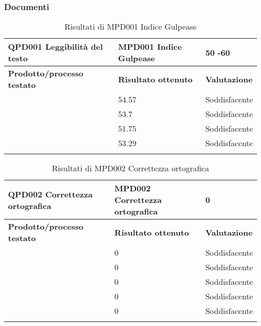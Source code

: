     \subsubsection{Documenti}
    
    \begin{table}[H]
    	{\def\arraystretch{1.5}
   		\begin{tabularx}{\textwidth}{YYY}
   			\textbf{QPD001 Leggibilità del testo} & \textbf{MPD001 Indice Gulpease} & \textbf{50 -60} \\
   			\hline
   			\textbf{Prodotto/processo testato} & \textbf{Risultato ottenuto} & \textbf{Valutazione} \\
   			\hline
   			\NdPd & 54.57 & Soddisfacente \\
   			\SdFd & 53.7 & Soddisfacente \\
   			\PdPd & 51.75 & Soddisfacente \\
   			\PdQd & 53.29 & Soddisfacente \\
   			\hline {}
   			 \\
   		\end{tabularx}}
   	\caption{Risultati di MPD001 Indice Gulpease}
    \end{table}

	\mydoublerule{\linewidth}{0pt}{2pt}

	\begin{table}[H]
		{\def\arraystretch{1.5}
		\begin{tabularx}{\textwidth}{YYY}
			\textbf{QPD002 Correttezza ortografica} & \textbf{MPD002 Correttezza
				ortografica} & \textbf{0} \\
			\hline
			\textbf{Prodotto/processo testato} & \textbf{Risultato ottenuto} & \textbf{Valutazione} \\
			\hline
			\NdPd & 0 & Soddisfacente \\
			\SdFd & 0 & Soddisfacente \\
			\PdPd & 0 & Soddisfacente \\
			\PdQd & 0 & Soddisfacente \\
			\AdRd & 0 & Soddisfacente \\
			\hline {}
			 \\
		\end{tabularx}}
	\caption{Risultati di MPD002 Correttezza
		ortografica}
	\end{table}

